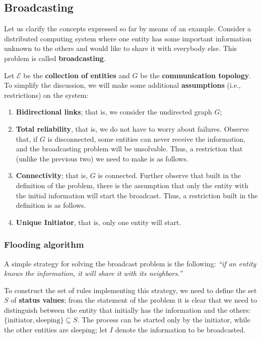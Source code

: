 \subsection{Broadcasting}
Let us clarify the concepts expressed so far by means of an example. Consider a distributed computing system where one entity has some important information unknown to the others and would like to share it with everybody else.  This problem is called \textbf{broadcasting}.

Let $\mathcal{E}$ be the \textbf{collection of entities} and $G$ be the \textbf{communication topology}. To simplify the discussion, we will make some additional \textbf{assumptions} (i.e., restrictions) on the system:
\begin{enumerate}
    \item \textbf{Bidirectional links}; that is, we consider the undirected graph $G$;
    \item \textbf{Total reliability}, that is, we do not have to worry about failures. Observe that, if $G$ is disconnected, some entities can never receive the information, and the broadcasting problem will be unsolvable. Thus, a restriction that (unlike the previous two) we need to make is as follows.
    \item \textbf{Connectivity}; that is, $G$ is connected. Further observe that built in the definition of the problem, there is the assumption that only the entity with the initial information will start the broadcast. Thus, a restriction built in the definition is as follows.
    \item \textbf{Unique Initiator}, that is, only one entity will start.
\end{enumerate}

\subsubsection{Flooding algorithm}
A simple strategy for solving the broadcast problem is the following: \textit{“if an entity knows the information, it will share it with its neighbors.”}

To construct the set of rules implementing this strategy, we need to define the set $S$ of \textbf{status values}; from the statement of the problem it is clear that we need to distinguish between the entity that initially has the information and the others: $\{\text{initiator}, \text{sleeping}\} \subseteq S$. The process can be started only by the initiator, while the other entities are sleeping; let $I$ denote the information to be broadcasted. 

